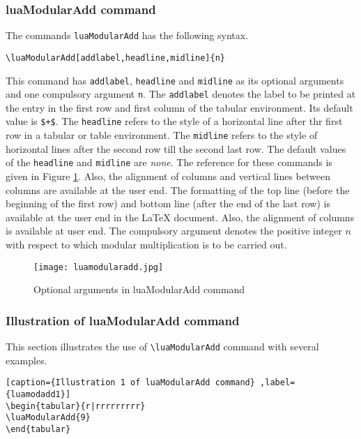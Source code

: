 ﻿\documentclass{article}
\begin{document}
\subsubsection{luaModularAdd command}
The commands \verb|luaModularAdd| has the following syntax.
\begin{verbatim}
\luaModularAdd[addlabel,headline,midline]{n}
\end{verbatim}
This command has  \verb|addlabel|, \verb|headline| and \verb|midline| as its optional arguments and one compulsory argument \verb|n|. The \verb|addlabel| denotes the label to be printed at the entry in the first row and first column of the tabular environment. Its default value is \verb|$+$|. The \verb|headline| refers to the style of a horizontal line after thr first row in a tabular or table environment. The \verb|midline| refers to the style of horizontal lines after the second row till the second last row.  The default values of the \verb|headline| and \verb|midline| are \emph{none}.  The reference for these commands is given in Figure \ref{fig:luamodularadd}. Also, the alignment of columns and vertical lines between columns are available at the user end. The formatting of the top line (before the beginning of the first row) and bottom line (after the end of the last row) is available at the user end in the LaTeX document. Also, the alignment of columns is available at user end. The compulsory argument denotes the positive integer \(n\) with respect to which modular multiplication is to be carried out.

\begin{figure}[!ht] %
  \centering
  \texttt{[image: luamodularadd.jpg]}
  \caption{Optional arguments in luaModularAdd command}
  \label{fig:luamodularadd}
\end{figure}
\subsubsection{Illustration of luaModularAdd command }
This section illustrates the use of \verb|\luaModularAdd| command with several examples.
\begin{lstlisting}[caption={Illustration 1 of luaModularAdd command} ,label={luamodadd1}]
\begin{tabular}{r|rrrrrrrrr}
\luaModularAdd{9}
\end{tabular}
\end{lstlisting}
\end{document}
